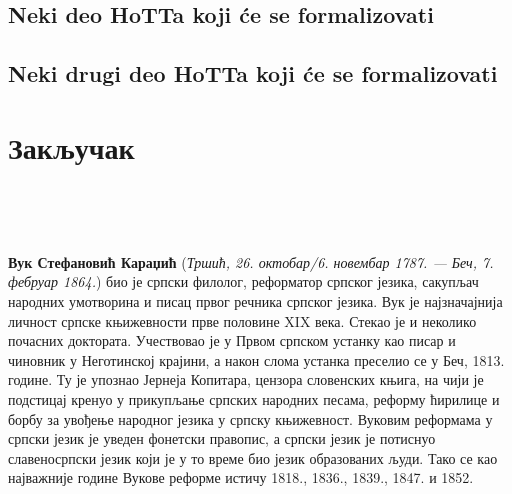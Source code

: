 \documentclass[12pt,oneside]{memoir}
\begin{document}
\section{Neki deo HoTTa koji će se formalizovati}
\section{Neki drugi deo HoTTa koji će se formalizovati}


\chapter{Закључак}

\nocite{*}
\literatura\

\backmatter\

\begin{biografija}
\textbf{Вук Стефановић Караџић} (\emph{Тршић, 26. октобар/6. новембар
  1787. — Беч, 7. фебруар 1864.}) био је српски филолог, реформатор
српског језика, сакупљач народних умотворина и писац првог речника
српског језика.  Вук је најзначајнија личност српске књижевности прве
половине XIX века. Стекао је и неколико почасних доктората.
Учествовао је у Првом српском устанку као писар и чиновник у
Неготинској крајини, а након слома устанка преселио се у Беч,
1813. године. Ту је упознао Јернеја Копитара, цензора словенских
књига, на чији је подстицај кренуо у прикупљање српских народних
песама, реформу ћирилице и борбу за увођење народног језика у српску
књижевност. Вуковим реформама у српски језик је уведен фонетски
правопис, а српски језик је потиснуо славеносрпски језик који је у то
време био језик образованих људи. Тако се као најважније године Вукове
реформе истичу 1818., 1836., 1839., 1847. и 1852.
\end{biografija}
\end{document}
